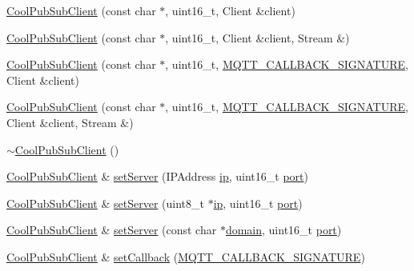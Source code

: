 \begin{DoxyCompactItemize}
\item 
\hyperlink{class_cool_pub_sub_client_a469eefe7429f0cbb6d7d443b52488411}{Cool\+Pub\+Sub\+Client} (const char $\ast$, uint16\+\_\+t, Client \&client)
\item 
\hyperlink{class_cool_pub_sub_client_a103e7286407babde84d63bb735c4e4b6}{Cool\+Pub\+Sub\+Client} (const char $\ast$, uint16\+\_\+t, Client \&client, Stream \&)
\item 
\hyperlink{class_cool_pub_sub_client_a2aea0a9487dc15b9db1caf0f069eb877}{Cool\+Pub\+Sub\+Client} (const char $\ast$, uint16\+\_\+t, \hyperlink{class_cool_pub_sub_client_a021ec75e9fbaf658370b8005ccfddc14}{M\+Q\+T\+T\+\_\+\+C\+A\+L\+L\+B\+A\+C\+K\+\_\+\+S\+I\+G\+N\+A\+T\+U\+RE}, Client \&client)
\item 
\hyperlink{class_cool_pub_sub_client_a6466f55abe5820d410b1c9cf7a70ec7e}{Cool\+Pub\+Sub\+Client} (const char $\ast$, uint16\+\_\+t, \hyperlink{class_cool_pub_sub_client_a021ec75e9fbaf658370b8005ccfddc14}{M\+Q\+T\+T\+\_\+\+C\+A\+L\+L\+B\+A\+C\+K\+\_\+\+S\+I\+G\+N\+A\+T\+U\+RE}, Client \&client, Stream \&)
\item 
\hyperlink{class_cool_pub_sub_client_aa9404bea508c0755d3d3ea29e921d60f}{$\sim$\+Cool\+Pub\+Sub\+Client} ()
\item 
\hyperlink{class_cool_pub_sub_client}{Cool\+Pub\+Sub\+Client} \& \hyperlink{class_cool_pub_sub_client_a947e70c394c66c7d08d0c53caf8425e3}{set\+Server} (I\+P\+Address \hyperlink{class_cool_pub_sub_client_adabd958c6c3462433a3f3393f40a0966}{ip}, uint16\+\_\+t \hyperlink{class_cool_pub_sub_client_a01e3249102c057756af7a515c179844e}{port})
\item 
\hyperlink{class_cool_pub_sub_client}{Cool\+Pub\+Sub\+Client} \& \hyperlink{class_cool_pub_sub_client_ad589f977fc2799b9341dc5f4fcdb483a}{set\+Server} (uint8\+\_\+t $\ast$\hyperlink{class_cool_pub_sub_client_adabd958c6c3462433a3f3393f40a0966}{ip}, uint16\+\_\+t \hyperlink{class_cool_pub_sub_client_a01e3249102c057756af7a515c179844e}{port})
\item 
\hyperlink{class_cool_pub_sub_client}{Cool\+Pub\+Sub\+Client} \& \hyperlink{class_cool_pub_sub_client_a333ea9369dc88bb14d3fa6216e731c09}{set\+Server} (const char $\ast$\hyperlink{class_cool_pub_sub_client_a08d3a5619724f3408ad406ca4fb776e1}{domain}, uint16\+\_\+t \hyperlink{class_cool_pub_sub_client_a01e3249102c057756af7a515c179844e}{port})
\item 
\hyperlink{class_cool_pub_sub_client}{Cool\+Pub\+Sub\+Client} \& \hyperlink{class_cool_pub_sub_client_ac5cab7658f1bdded32131241e468e661}{set\+Callback} (\hyperlink{class_cool_pub_sub_client_a021ec75e9fbaf658370b8005ccfddc14}{M\+Q\+T\+T\+\_\+\+C\+A\+L\+L\+B\+A\+C\+K\+\_\+\+S\+I\+G\+N\+A\+T\+U\+RE})

\end{DoxyCompactItemize}
